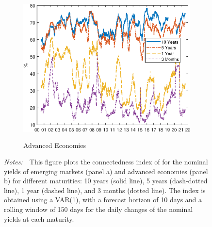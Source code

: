 \documentclass[a4paper, 12pt]{article}
\newcommand{\figtext}[1]{
	\vspace{-1ex}
	\captionsetup{justification=justified,font=footnotesize}
	\caption*{#1}
}
\newcommand{\fignotes}[1]{\figtext{\emph{Notes:~}~#1}}
\begin{document}
\begin{appendices}
\begin{figure}[tbph]
\begin{center}
\begin{minipage}{0.9\linewidth}
\begin{center}
					\begin{subfigure}[t]{\linewidth}
						\includegraphics[trim={0cm 0cm 0cm 0cm},clip,height=0.38\textheight,width=\linewidth]{../Figures/dy_index_dn_data_AE.eps} \\
						\vspace{-0.37cm}
						\caption{Advanced Economies} \label{subfig:dy_index_tsAE}
						\vspace{0.2cm}
					\end{subfigure}
					
				\end{center}
				\vspace{-0.45cm}
				\fignotes{This figure plots the connectedness index of \cite{DieboldYilmaz:2014} for the nominal yields of emerging markets (panel a) and advanced economies (panel b) for different maturities: 10 years (solid line), 5 years (dash-dotted line), 1 year (dashed line), and 3 months (dotted line). The index is obtained using a VAR(1), with a forecast horizon of 10 days and a rolling window of 150 days for the daily changes of the nominal yields at each maturity.}
			\end{minipage}
		\end{center}
	\end{figure}
	

\end{appendices}
\end{document}
